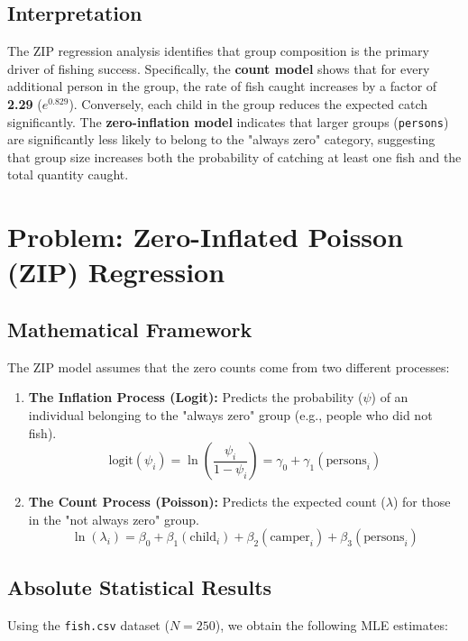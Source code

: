 \documentclass[12pt]{article}
\begin{document}
\subsection{Interpretation}
The ZIP regression analysis identifies that group composition is the primary driver of fishing success. Specifically, the \textbf{count model} shows that for every additional person in the group, the rate of fish caught increases by a factor of \textbf{2.29} ($e^{0.829}$). Conversely, each child in the group reduces the expected catch significantly. The \textbf{zero-inflation model} indicates that larger groups (\texttt{persons}) are significantly less likely to belong to the "always zero" category, suggesting that group size increases both the probability of catching at least one fish and the total quantity caught.

\section{Problem: Zero-Inflated Poisson (ZIP) Regression}

\subsection{Mathematical Framework}
The ZIP model assumes that the zero counts come from two different processes:
\begin{enumerate}
    \item \textbf{The Inflation Process (Logit):} Predicts the probability ($\psi$) of an individual belonging to the "always zero" group (e.g., people who did not fish).
    \[ \text{logit}(\psi_i) = \ln\left(\frac{\psi_i}{1-\psi_i}\right) = \gamma_0 + \gamma_1 (\text{persons}_i) \]
    \item \textbf{The Count Process (Poisson):} Predicts the expected count ($\lambda$) for those in the "not always zero" group.
    \[ \ln(\lambda_i) = \beta_0 + \beta_1 (\text{child}_i) + \beta_2 (\text{camper}_i) + \beta_3 (\text{persons}_i) \]
\end{enumerate}

\subsection{Absolute Statistical Results}
Using the \texttt{fish.csv} dataset ($N=250$), we obtain the following MLE estimates:
\end{document}
